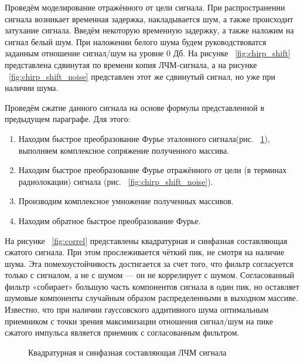 Проведём моделирование отражённого от цели сигнала. При распространении сигнала возникает временная задержка, накладывается шум, а также происходит затухание сигнала. Введём некоторую временную задержку, а также наложим на сигнал белый шум. При наложении белого шума будем руководствоватся заданным отношение сигнал/шум на уровне 0 Дб. На рисунке ~\ref{fig:chirp_shift} представлена сдвинутая по времени копия ЛЧМ-сигнала, а на рисунке ~\ref{fig:chirp_shift_noise} представлен этот же сдвинутый сигнал, но уже при наличии шума.  

Проведём сжатие данного сигнала на основе формулы представленной в предыдущем параграфе. Для этого:

\begin{enumerate}
	\item Находим быстрое преобразование Фурье эталонного сигнала(рис. ~\ref{fig:chirp}), выполняем комплексное сопряжение полученного массива.
	\item Находим быстрое преобразование Фурье отражённого от цели (в терминах радиолокации) сигнала (рис. ~\ref{fig:chirp_shift_noise}).
	\item Производим комплексное умножение полученных массивов.
	\item Находим обратное быстрое преобразование Фурье.
\end{enumerate}

На рисунке ~\ref{fig:correl} представлены квадратурная и синфазная составляющая сжатого сигнала. При этом прослеживается чёткий пик, не смотря на наличие шума. Эта помехоустойчивость достигается за счет того, что фильтр согласуется только с сигналом, а не с шумом — он не коррелирует с шумом. Согласованный фильтр «собирает» большую часть компонентов сигнала в один пик, но оставляет шумовые компоненты случайным образом распределенными в выходном массиве. Известно, что при наличии гауссовского аддитивного шума оптимальным приемником с точки зрения максимизации отношения сигнал/шум на пике сжатого импульса является приемник с согласованным фильтром.

\begin{figure}[h]
    \centering
    \noindent
    \caption{Квадратурная и синфазная составляющая ЛЧМ сигнала}
    \label{fig:chirp}
\end{figure}

